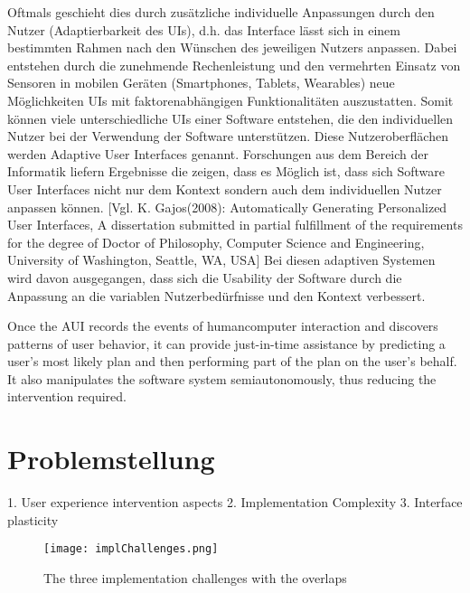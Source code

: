 Oftmals geschieht dies durch zusätzliche individuelle Anpassungen durch den Nutzer (Adaptierbarkeit des UIs),
d.h. das Interface lässt sich in einem bestimmten Rahmen nach den Wünschen des jeweiligen Nutzers anpassen.
Dabei entstehen durch die zunehmende Rechenleistung und den vermehrten Einsatz von Sensoren in mobilen Geräten
(Smartphones, Tablets, Wearables) neue Möglichkeiten UIs mit faktorenabhängigen Funktionalitäten auszustatten.
Somit können viele unterschiedliche UIs einer Software entstehen, die den individuellen Nutzer bei der Verwendung der Software unterstützen.
Diese Nutzeroberflächen werden Adaptive User Interfaces genannt. Forschungen aus dem Bereich der Informatik liefern Ergebnisse die zeigen,
dass es Möglich ist, dass sich Software User Interfaces nicht nur dem Kontext sondern auch dem individuellen Nutzer anpassen können. [Vgl. K. Gajos(2008): Automatically Generating Personalized User Interfaces, A dissertation submitted in partial fulfillment of the requirements for the degree of Doctor of Philosophy, Computer Science and Engineering, University of Washington, Seattle, WA, USA]
Bei diesen adaptiven Systemen wird davon ausgegangen, dass sich die Usability der Software durch die Anpassung an die
variablen Nutzerbedürfnisse und den Kontext verbessert.

Once the AUI records the events of humancomputer interaction and discovers patterns of user behavior, it can provide just-in-time assistance by
predicting a user’s most likely plan and then performing part of the plan on the user’s behalf. It also manipulates the software system semiautonomously,
thus reducing the intervention required.

\section{Problemstellung}
1. User experience intervention aspects
2. Implementation Complexity
3. Interface plasticity

\begin{figure}[h]
    \centering
    \texttt{[image: implChallenges.png]}
    \caption{The three implementation challenges with the overlaps}
\end{figure}

